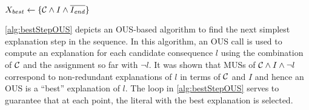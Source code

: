 \begin{algorithm}[ht]
  \caption{$\call{bestStep--OUS}({\cal C},f,I,\Iend)$}
  \label{alg:bestStepOUS}
$X_{best} \gets \{{\cal C} \land I \land \overline{I_{\mathit{end}}}\}$\;
\end{algorithm}

\cref{alg:bestStepOUS} depicts an OUS-based algorithm to find the next simplest explanation step in the sequence. 
In this algorithm, an OUS call is used to compute an explanation for each candidate consequence $l$ using the combination of $\mathcal{C} $ and the assignment so far with $\lnot l$. 
It was shown that MUSs of $\mathcal{C} \land I\land\lnot l$ correspond to non-redundant explanations of $l$ in terms of $\mathcal{C} $ and $I$ and hence an OUS is a ``best'' explanation of $l$. 
The loop in \cref{alg:bestStepOUS} serves to guarantee that at each point, the literal with the best explanation is selected. 





